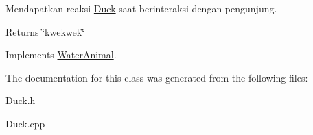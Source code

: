 Mendapatkan reaksi \hyperlink{classDuck}{Duck} saat berinteraksi dengan pengunjung. 

\begin{DoxyReturn}{Returns}
\char`\"{}kwekwek\char`\"{} 
\end{DoxyReturn}


Implements \hyperlink{classWaterAnimal}{Water\-Animal}.



The documentation for this class was generated from the following files\-:\begin{DoxyCompactItemize}
\item 
Duck.\-h\item 
Duck.\-cpp\end{DoxyCompactItemize}
